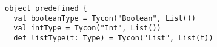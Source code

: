 \begin{itemize}



\begin{lstlisting}
object predefined {
  val booleanType = Tycon("Boolean", List())
  val intType = Tycon("Int", List())
  def listType(t: Type) = Tycon("List", List(t))


\end{lstlisting}
\end{itemize}
